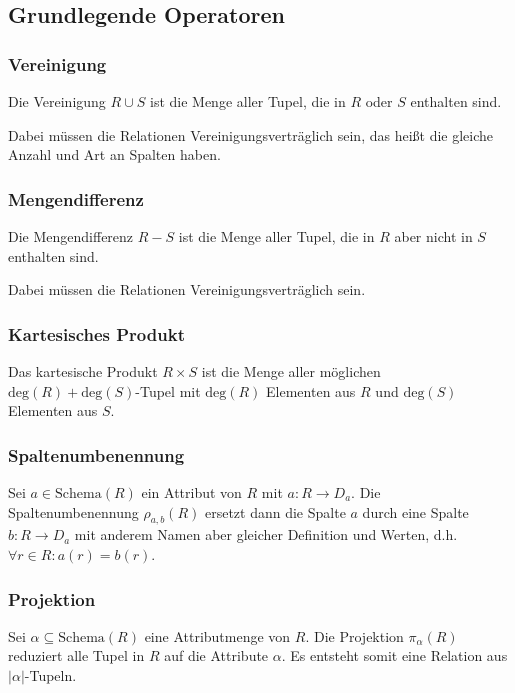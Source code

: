 \documentclass[a4paper, 11pt, accentcolor = tud3b]{tudreport}
\providecommand{\abs}[1]{\ensuremath{{\lvert #1 \rvert}}}
\newcommand{\Schema}{\text{Schema}}
\begin{document}
            \subsection{Grundlegende Operatoren} %
                \subsubsection{Vereinigung} %
                    Die Vereinigung \( R \cup S \) ist die Menge aller Tupel, die in \(R\) oder \(S\) enthalten sind.
                    
                    Dabei müssen die Relationen Vereinigungsverträglich sein, das heißt die gleiche Anzahl und Art an Spalten haben.

                \subsubsection{Mengendifferenz} %
                    Die Mengendifferenz \( R - S \) ist die Menge aller Tupel, die in \(R\) aber nicht in \(S\) enthalten sind.
                    
                    Dabei müssen die Relationen Vereinigungsverträglich sein.

                \subsubsection{Kartesisches Produkt} %
                    Das kartesische Produkt \( R \times S \) ist die Menge aller möglichen \( \text{deg}(R) + \text{deg}(S) \)-Tupel mit \( \text{deg}(R) \) Elementen aus \(R\) und \( \text{deg}(S) \) Elementen aus \(S\).

                \subsubsection{Spaltenumbenennung} %
                    Sei \( a \in \Schema(R) \) ein Attribut von \(R\) mit \( a : R \rightarrow D _ a \). Die Spaltenumbenennung \( \rho_{a,b}(R) \) ersetzt dann die Spalte \(a\) durch eine Spalte \( b : R \rightarrow D _ a \) mit anderem Namen aber gleicher Definition und Werten, d.h. \( \forall r \in R : a(r) = b(r) \).

                \subsubsection{Projektion} %
                    Sei \( \alpha \subseteq \Schema(R) \) eine Attributmenge von \(R\). Die Projektion \( \pi_\alpha(R) \) reduziert alle Tupel in \(R\) auf die Attribute \(\alpha\). Es entsteht somit eine Relation aus \(\abs{\alpha}\)-Tupeln.
                    
\end{document}
